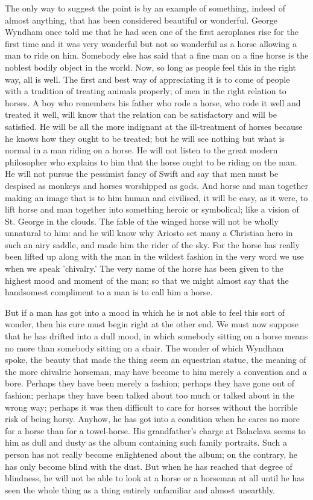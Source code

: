 The only way to suggest the point is by an example of something, indeed of almost anything, that has been considered beautiful or wonderful. George Wyndham once told me that he had seen one of the first aeroplanes rise for the first time and it was very wonderful but not so wonderful as a horse allowing a man to ride on him. Somebody else has said that a fine man on a fine horse is the noblest bodily object in the world. Now, so long as people feel this in the right way, all is well. The first and best way of appreciating it is to come of people with a tradition of treating animals properly; of men in the right relation to horses. A boy who remembers his father who rode a horse, who rode it well and treated it well, will know that the relation can be satisfactory and will be satisfied. He will be all the more indignant at the ill-treatment of horses because he knows how they ought to be treated; but he will see nothing but what is normal in a man riding on a horse. He will not listen to the great modern philosopher who explains to him that the horse ought to be riding on the man. He will not pursue the pessimist fancy of Swift and say that men must be despised as monkeys and horses worshipped as gods. And horse and man together making an image that is to him human and civilised, it will be easy, as it were, to lift horse and man together into something heroic or symbolical; like a vision of St. George in the clouds. The fable of the winged horse will not be wholly unnatural to him: and he will know why Ariosto set many a Christian hero in such an airy saddle, and made him the rider of the sky. For the horse has really been lifted up along with the man in the wildest fashion in the very word we use when we speak 'chivalry.' The very name of the horse has been given to the highest mood and moment of the man; so that we might almost say that the handsomest compliment to a man is to call him a horse.

But if a man has got into a mood in which he is not able to feel this sort of wonder, then his cure must begin right at the other end. We must now suppose that he has drifted into a dull mood, in which somebody sitting on a horse means no more than somebody sitting on a chair. The wonder of which Wyndham spoke, the beauty that made the thing seem an equestrian statue, the meaning of the more chivalric horseman, may have become to him merely a convention and a bore. Perhaps they have been merely a fashion; perhaps they have gone out of fashion; perhaps they have been talked about too much or talked about in the wrong way; perhaps it was then difficult to care for horses without the horrible risk of being horsy. Anyhow, he has got into a condition when he cares no more for a horse than for a towel-horse. His grandfather's charge at Balaclava seems to him as dull and dusty as the album containing such family portraits. Such a person has not really become enlightened about the album; on the contrary, he has only become blind with the dust. But when he has reached that degree of blindness, he will not be able to look at a horse or a horseman at all until he has seen the whole thing as a thing entirely unfamiliar and almost unearthly.

